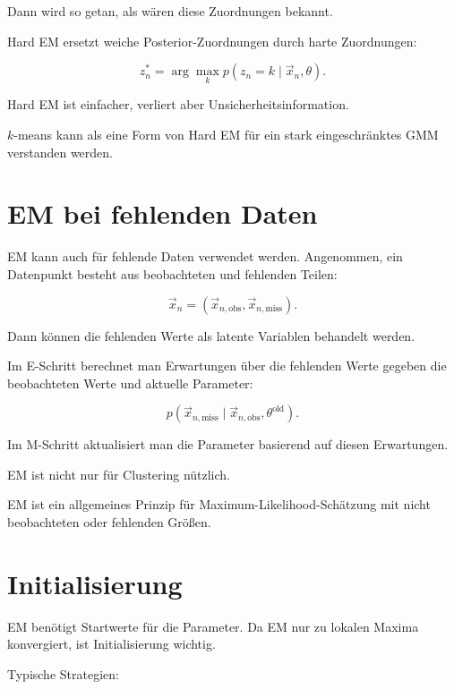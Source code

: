 Dann wird so getan, als wären diese Zuordnungen bekannt.

\begin{definitionbox}
Hard EM ersetzt weiche Posterior-Zuordnungen durch harte Zuordnungen:

\[
    z_n^{*}
    =
    \arg\max_k
    p(z_n=k\mid\vec{x}_n,\theta).
\]
\end{definitionbox}

\begin{conceptbox}
Hard EM ist einfacher, verliert aber Unsicherheitsinformation.

\(k\)-means kann als eine Form von Hard EM für ein stark eingeschränktes GMM verstanden werden.
\end{conceptbox}

\section{EM bei fehlenden Daten}

EM kann auch für fehlende Daten verwendet werden.
Angenommen, ein Datenpunkt besteht aus beobachteten und fehlenden Teilen:

\[
    \vec{x}_n
    =
    (\vec{x}_{n,\mathrm{obs}},\vec{x}_{n,\mathrm{miss}}).
\]

Dann können die fehlenden Werte als latente Variablen behandelt werden.

Im E-Schritt berechnet man Erwartungen über die fehlenden Werte gegeben die beobachteten Werte und aktuelle Parameter:

\[
    p(\vec{x}_{n,\mathrm{miss}}\mid\vec{x}_{n,\mathrm{obs}},\theta^{\mathrm{old}}).
\]

Im M-Schritt aktualisiert man die Parameter basierend auf diesen Erwartungen.

\begin{conceptbox}
EM ist nicht nur für Clustering nützlich.

EM ist ein allgemeines Prinzip für Maximum-Likelihood-Schätzung mit nicht beobachteten oder fehlenden Größen.
\end{conceptbox}

\section{Initialisierung}

EM benötigt Startwerte für die Parameter.
Da EM nur zu lokalen Maxima konvergiert, ist Initialisierung wichtig.

Typische Strategien:

